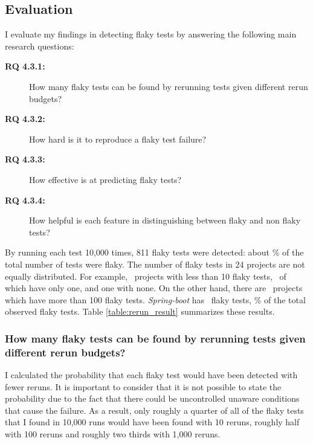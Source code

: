 



\subsection{Evaluation}
I evaluate my findings in detecting flaky tests by answering the following  main research questions:


\begin{description}
  \item[\textbf{RQ 4.3.1:}] How many flaky tests can be found by rerunning tests given different rerun budgets?
  \item[\textbf{RQ 4.3.2:}] How hard is it to reproduce a flaky test failure?

  \item[\textbf{RQ 4.3.3:}] How effective is \sysName at predicting flaky tests?
  \item[\textbf{RQ 4.3.4:}] How helpful is each feature in distinguishing between flaky and non flaky tests?
  
 \end{description}



By running each test 10,000 times, 811 flaky tests were detected: about \flakytestsrate\% of the total number of tests were flaky. The number of flaky tests in 24 projects are not equally distributed. For example, \projectsout~projects with less than 10 flaky tests, \projectsoneflaky~of which have only one, and one with none. On the other hand, there are \projectshundredsflaky~projects which have more than 100 flaky tests. \emph{Spring-boot} has \springbootFlaky~flaky tests, \highestflakyrate\% of the total observed flaky tests. Table \ref{table:rerun_result} summarizes these results. 

\subsubsection{How many flaky tests can be found by rerunning tests given different rerun budgets?} 
\label{FlakeFlaggerRQ1}

I calculated the probability that each flaky test would have been detected with fewer reruns. It is important to consider that it is not possible to state the probability due to the fact that there could be uncontrolled unaware conditions that cause the failure. As a result, only roughly a quarter of all of the flaky tests that I found in 10,000 runs would have been found with 10 reruns, roughly half with 100 reruns and roughly two thirds with 1,000 reruns.

